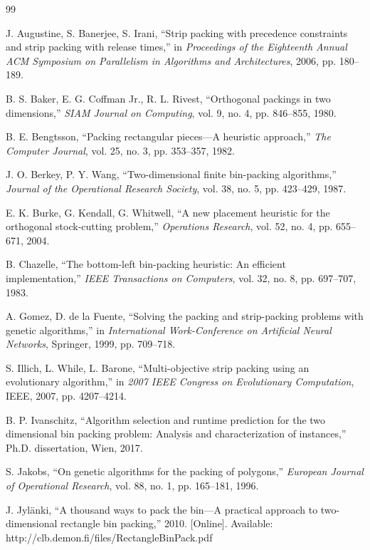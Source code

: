 \documentclass[11pt,a4paper]{article}
\begin{document}
\begin{thebibliography}{99}

J. Augustine, S. Banerjee, S. Irani, ``Strip packing with precedence constraints and strip packing with release times,'' in \textit{Proceedings of the Eighteenth Annual ACM Symposium on Parallelism in Algorithms and Architectures}, 2006, pp. 180--189.

B. S. Baker, E. G. Coffman Jr., R. L. Rivest, ``Orthogonal packings in two dimensions,'' \textit{SIAM Journal on Computing}, vol. 9, no. 4, pp. 846--855, 1980.

B. E. Bengtsson, ``Packing rectangular pieces—A heuristic approach,'' \textit{The Computer Journal}, vol. 25, no. 3, pp. 353--357, 1982.

J. O. Berkey, P. Y. Wang, ``Two-dimensional finite bin-packing algorithms,'' \textit{Journal of the Operational Research Society}, vol. 38, no. 5, pp. 423--429, 1987.

E. K. Burke, G. Kendall, G. Whitwell, ``A new placement heuristic for the orthogonal stock-cutting problem,'' \textit{Operations Research}, vol. 52, no. 4, pp. 655--671, 2004.

B. Chazelle, ``The bottom-left bin-packing heuristic: An efficient implementation,'' \textit{IEEE Transactions on Computers}, vol. 32, no. 8, pp. 697--707, 1983.

A. Gomez, D. de la Fuente, ``Solving the packing and strip-packing problems with genetic algorithms,'' in \textit{International Work-Conference on Artificial Neural Networks}, Springer, 1999, pp. 709--718.

S. Illich, L. While, L. Barone, ``Multi-objective strip packing using an evolutionary algorithm,'' in \textit{2007 IEEE Congress on Evolutionary Computation}, IEEE, 2007, pp. 4207--4214.

B. P. Ivanschitz, ``Algorithm selection and runtime prediction for the two dimensional bin packing problem: Analysis and characterization of instances,'' Ph.D. dissertation, Wien, 2017.

S. Jakobs, ``On genetic algorithms for the packing of polygons,'' \textit{European Journal of Operational Research}, vol. 88, no. 1, pp. 165--181, 1996.

J. Jyl\"{a}nki, ``A thousand ways to pack the bin—A practical approach to two-dimensional rectangle bin packing,'' 2010. [Online]. Available: http://clb.demon.fi/files/RectangleBinPack.pdf


\end{thebibliography}
\end{document}
